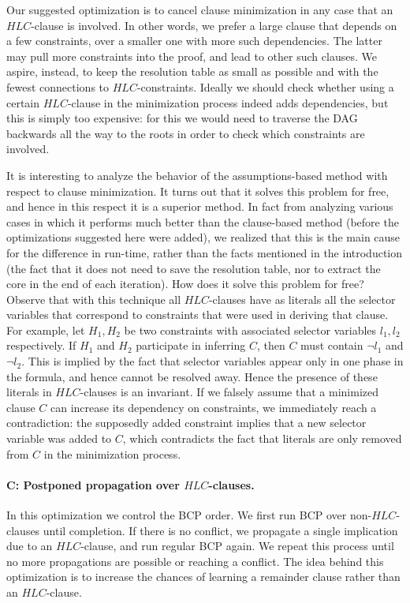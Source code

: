 \documentclass[twoside,11pt]{article}
\begin{document}
Our suggested optimization is to cancel clause minimization in any case that an $HLC$-clause is involved. In other words, we prefer a large clause that depends on a few constraints, over a smaller one with more such dependencies. The latter may pull more constraints into the proof, and lead to other such clauses. We aspire, instead, to keep the resolution table as small as possible and with the fewest connections to $HLC$-constraints. Ideally we should check whether using a certain $HLC$-clause in the minimization process indeed adds dependencies, but this is simply too expensive: for this we would need to traverse the DAG backwards all the way to the roots in order to check which constraints are involved.

It is interesting to analyze the behavior of the assumptions-based method
with respect to clause minimization. It turns out that it solves this problem
for free, and hence in this respect it is a superior method. In fact from
analyzing various cases in which it performs much better than the
clause-based method (before the optimizations suggested here were added), we
realized that this is the main cause for the difference in run-time, rather
than the facts mentioned in the introduction (the fact that it does not need
to save the resolution table, nor to extract the core in the end of each
iteration). How does it solve this problem for free? Observe that with this
technique all $HLC$-clauses have as literals all the selector variables that
correspond to constraints that were used in deriving that clause. For
example, let $H_1, H_2$ be two constraints with associated selector variables
$l_1,l_2$ respectively. If $H_1$ and $H_2$ participate in inferring $C$, then
$C$ must contain $\lnot l_1$ and $\lnot l_2$. This is implied by the fact
that selector variables appear only in one phase in the formula, and hence
cannot be resolved away. Hence the presence of
these literals in $HLC$-clauses is an invariant. If we falsely assume that a
minimized clause $C$ can increase its dependency on constraints, we
immediately reach a contradiction: the supposedly added constraint implies
that a new selector variable was added to $C$, which contradicts the fact
that literals are only removed from $C$ in the minimization process.

\paragraph{C: Postponed propagation over $HLC$-clauses.} In this optimization we control the BCP order. We first run BCP over non-$HLC$-clauses until completion. If there is no conflict, we propagate a single implication due to an $HLC$-clause, and run regular BCP again. We repeat this process until no more propagations are possible or reaching a conflict. The idea behind this optimization is to increase the chances of learning a remainder clause rather than an $HLC$-clause.
\end{document}
